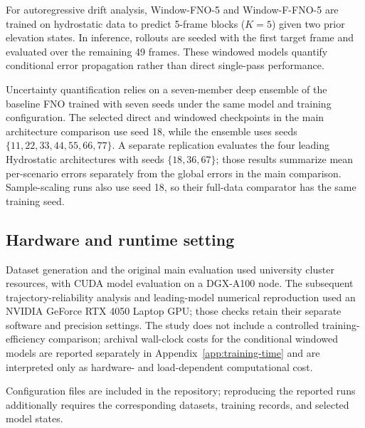 For autoregressive drift analysis, Window-FNO-5 and Window-F-FNO-5 are trained on hydrostatic data to predict 5-frame blocks ($K = 5$) given two prior elevation states. In inference, rollouts are seeded with the first target frame and evaluated over the remaining 49 frames. These windowed models quantify conditional error propagation rather than direct single-pass performance.

Uncertainty quantification relies on a seven-member deep ensemble of the baseline FNO trained with seven seeds under the same model and training configuration. The selected direct and windowed checkpoints in the main architecture comparison use seed 18, while the ensemble uses seeds $\{11, 22, 33, 44, 55, 66, 77\}$. A separate replication evaluates the four leading Hydrostatic architectures with seeds $\{18, 36, 67\}$; those results summarize mean per-scenario errors separately from the global errors in the main comparison. Sample-scaling runs also use seed 18, so their full-data comparator has the same training seed.

\subsection{Hardware and runtime setting}
\label{subsec:train-hardware}

Dataset generation and the original main evaluation used university cluster resources, with CUDA model evaluation on a DGX-A100 node. The subsequent trajectory-reliability analysis and leading-model numerical reproduction used an NVIDIA GeForce RTX 4050 Laptop GPU; those checks retain their separate software and precision settings. The study does not include a controlled training-efficiency comparison; archival wall-clock costs for the conditional windowed models are reported separately in Appendix~\ref{app:training-time} and are interpreted only as hardware- and load-dependent computational cost.

Configuration files are included in the repository; reproducing the reported runs additionally requires the corresponding datasets, training records, and selected model states.
